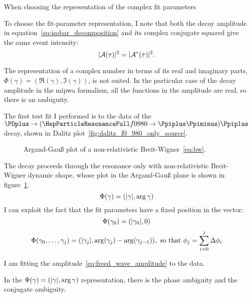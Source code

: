     When choosing the representation of the complex fit parameters


    To choose the fit-parameter representation, I note that both the decay amplitude in equation~\eqref{eq:isobar_decomposition} and its complex conjugate squared give the same event intensity:
    \begin{equation}
        \lvert\mathcal{A}(\tau)\rvert^2 = \lvert\mathcal{A}^*(\tau)\rvert^2.
    \end{equation}

    The representation of a complex number in terms of its real and imaginary parts, $\Phi(\gamma) = (\Re(\gamma), \Im(\gamma))$, is not suited.
    In the particular case of the decay amplitude in the \ac{mipwa} formalism, all the functions in the amplitude are real, so there is an ambiguity.





    The first test fit I performed is to the data of the $\PDplus\to(\Pfnez\to\Ppiplus\Ppiminus)\Ppiplus$ decay, shown in Dalitz plot~\ref{fig:dalitz_f0_980_only_source}.
    \begin{figure}
        \centering
        
        \caption{Argand-Gau\ss{} plot of a non-relativistic Breit-Wigner~\eqref{eq:bw}.}
        \label{fig:bw_argand_gauss}
    \end{figure}
    The decay proceeds through the \Pfnez{} resonance only with non-relativistic Breit-Wigner dynamic shape, whose plot in the Argand-Gau\ss{} plane is shown in figure~\ref{fig:bw_argand_gauss}.
    \begin{equation}
        \Phi(\gamma) = (\lvert\gamma\rvert, \arg\gamma)
    \end{equation}
    I can exploit the fact that the fit parameters have a fixed position in the vector:
    \begin{equation}
        \Phi(\gamma_0) = (\lvert\gamma_0\rvert, 0)
    \end{equation}
    \begin{equation}
        \Phi(\gamma_0,\dots,\gamma_j) = (\lvert\gamma_j\rvert, \arg(\gamma_j) - \arg(\gamma_{j-1})), \text{ so that }\phi_j = \sum_{i=0}^j \mathop{}\!\textup{$\Delta$} \phi_i
    \end{equation}



    I am fitting the amplitude~\eqref{eq:freed_wave_amplitude} to the data.


    In the $\Phi(\gamma) = (\lvert\gamma\rvert, \arg\gamma)$ representation, there is the phase ambiguity and the conjugate ambiguity.


